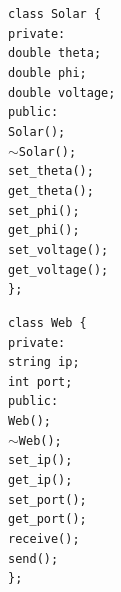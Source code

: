 \begin{flushleft}
    \begin{flushleft}
        \texttt{class Solar \{}  \\
        \quad\texttt{private:} \\
        \quad\quad\texttt{double theta;} \\
        \quad\quad\texttt{double phi;} \\
        \quad\quad\texttt{double voltage;} \\
        \quad\texttt{public:} \\
        \quad\quad\texttt{Solar();} \\
        \quad\quad\texttt{$\sim$Solar();} \\
        \quad\quad\texttt{set\_theta();} \\
        \quad\quad\texttt{get\_theta();} \\
        \quad\quad\texttt{set\_phi();} \\
        \quad\quad\texttt{get\_phi();} \\
        \quad\quad\texttt{set\_voltage();} \\
        \quad\quad\texttt{get\_voltage();} \\
        \texttt{\};} \\
    \end{flushleft}
    \begin{flushleft}
        \texttt{class Web \{}  \\
        \quad\texttt{private:} \\
        \quad\quad\texttt{string ip;} \\
        \quad\quad\texttt{int port;} \\
        \quad\texttt{public:} \\
        \quad\quad\texttt{Web();} \\
        \quad\quad\texttt{$\sim$Web();} \\
        \quad\quad\texttt{set\_ip();} \\
        \quad\quad\texttt{get\_ip();} \\
        \quad\quad\texttt{set\_port();} \\
        \quad\quad\texttt{get\_port();} \\
        \quad\quad\texttt{receive();} \\
        \quad\quad\texttt{send();} \\
        \texttt{\};} \\
    \end{flushleft}
\end{flushleft}
